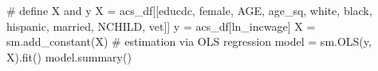 \documentclass[
  letterpaper,
  DIV=11,
  numbers=noendperiod]{scrartcl}
\newenvironment{Shaded}{\begin{snugshade}}{\end{snugshade}}
\newcommand{\CommentTok}[1]{\textcolor[rgb]{0.37,0.37,0.37}{#1}}
\newcommand{\NormalTok}[1]{\textcolor[rgb]{0.00,0.23,0.31}{#1}}
\newcommand{\OperatorTok}[1]{\textcolor[rgb]{0.37,0.37,0.37}{#1}}
\newcommand{\StringTok}[1]{\textcolor[rgb]{0.13,0.47,0.30}{#1}}
\begin{document}
\begin{Shaded}
\begin{Highlighting}[]
\CommentTok{\# define X and y}
\NormalTok{X }\OperatorTok{=}\NormalTok{ acs\_df[[}\StringTok{\textquotesingle{}educdc\textquotesingle{}}\NormalTok{, }\StringTok{\textquotesingle{}female\textquotesingle{}}\NormalTok{, }\StringTok{\textquotesingle{}AGE\textquotesingle{}}\NormalTok{, }\StringTok{\textquotesingle{}age\_sq\textquotesingle{}}\NormalTok{, }\StringTok{\textquotesingle{}white\textquotesingle{}}\NormalTok{, }\StringTok{\textquotesingle{}black\textquotesingle{}}\NormalTok{, }\StringTok{\textquotesingle{}hispanic\textquotesingle{}}\NormalTok{, }\StringTok{\textquotesingle{}married\textquotesingle{}}\NormalTok{, }\StringTok{\textquotesingle{}NCHILD\textquotesingle{}}\NormalTok{, }\StringTok{\textquotesingle{}vet\textquotesingle{}}\NormalTok{]]}
\NormalTok{y }\OperatorTok{=}\NormalTok{ acs\_df[}\StringTok{\textquotesingle{}ln\_incwage\textquotesingle{}}\NormalTok{]}
\NormalTok{X }\OperatorTok{=}\NormalTok{ sm.add\_constant(X)}
\CommentTok{\# estimation via OLS regression}
\NormalTok{model }\OperatorTok{=}\NormalTok{ sm.OLS(y, X).fit()}
\NormalTok{model.summary()}
\end{Highlighting}
\end{Shaded}
\end{document}
